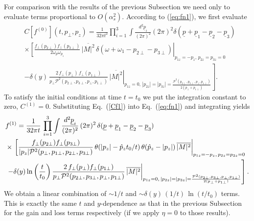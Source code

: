 \documentclass[onecolumn,showpacs,nobibnotes,nofootinbib,12pt,aps,prd,showpacs,notitlepage,nofootinbib,preprintnumbers,amsmath,amssymb]{article}
\def\eq#1{{Eq.~(\ref{#1})}}
\begin{document}
For comparison with the results of the previous Subsection we need
only to evaluate terms proportional to $O(\alpha_s^2)$. According to
(\ref{eq:fn1}), we first evaluate
\begin{align}
  & C[f^{(0)}](t,p_\perp,p_z) = \frac{1}{32\pi t^2}\prod\limits_{i=1}^3 \int \frac{d^2\underline{p}_i}{(2\pi)^2} (2\pi)^2 \delta(\underline{p}+\underline{p}_1-\underline{p}_2-\underline{p}_3) \nonumber\\
  &\times\left.\left[\frac{f_\perp(p_{2\perp}) f_\perp(p_{3\perp})}{2
        \omega_p \omega_{p_1}
      }  \, \overline{|M|^2} \, \delta(\omega+\omega_1- p_{2\perp}- p_{3\perp})\right.\right|_{p_{1z}=-p_z, \, p_{2z} = p_{3z}=0} \nonumber \\
  &\left.\left. -\delta(y) \, \frac{2 \, f_\perp(p_\perp) \,
        f_\perp(p_{1\perp})}{p_\perp \mathcal{P}^2(p_{2\perp},
        p_{3\perp},p_\perp,p_{1\perp})} \, \overline{|M|^2}
    \right|_{p_{1z}=0, \, |p_{2z}| = |p_{3z}| =
      \frac{\mathcal{P}^2(p_{2\perp},
        p_{3\perp},p_\perp,p_{1\perp})}{2 (p_\perp + p_{1\perp})}}
  \right]. \label{Cf1}
\end{align}
To satisfy the initial conditions at time $t = t_0$ we put the
integration constant to zero, $C^{(1)}=0$. Substituting \eq{Cf1} into
\eq{eq:fn1} and integrating yields
\begin{align}\label{eq:f1}
  & f^{(1)} = \frac{1}{32\pi t} \, \prod\limits_{i=1}^3\int\frac{d^2\underline{p}_i}{(2\pi)^2} \, (2\pi)^2 \, \delta(\underline{p}+\underline{p}_1-\underline{p}_2-\underline{p}_3) \\
  &\times \left. \left[\frac{f_\perp(p_{2\perp})
        f_\perp(p_{3\perp})}{|p_z|\mathcal{P}^2(p_\perp,p_{1\perp},p_{2\perp},
        p_{3\perp})
      } \, \theta(|p_z|-\hat{p}_z t_0/t) \, \theta(\hat{p}_z-|p_z|) \, \overline{|M|^2}\right|_{p_{1z}=-p_z, \, p_{2z} = p_{3z}=0} \right.\nonumber\\
  &\left. \left. -\delta(y)\ln\left(\frac{t}{t_0}\right) \frac{2 \,
        f_\perp(p_\perp)f_\perp(p_{1\perp})}{p_\perp
        \mathcal{P}^2(p_{2\perp}, p_{3\perp},p_\perp,p_{1\perp})} \,
      \overline{|M|^2} \right|_{p_{1z}=0, \, |p_{2z}| = |p_{3z}| =
      \frac{\mathcal{P}^2(p_{2\perp},
        p_{3\perp},p_\perp,p_{1\perp})}{2 (p_\perp +
        p_{1\perp})}}\right]. \notag
\end{align}
We obtain a linear combination of $\sim 1/t$ and $\sim \delta(y) \,
(1/t) \, \ln (t/t_0)$ terms. This is exactly the same $t$ and
$y$-dependence as that in the previous Subsection for the gain and
loss terms respectively (if we apply $\eta=0$ to those results).
\end{document}
